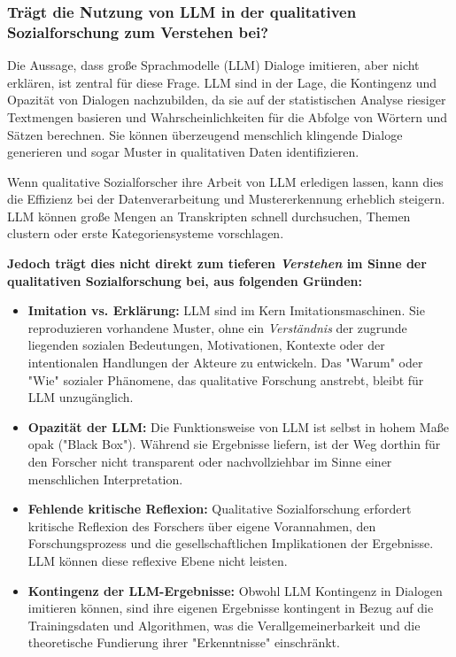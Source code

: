 \documentclass[
]{article}
\author{}
\date{}
\begin{document}
\subsubsection{\texorpdfstring{\textbf{Trägt die Nutzung von LLM in der
qualitativen Sozialforschung zum Verstehen
bei?}}{Trägt die Nutzung von LLM in der qualitativen Sozialforschung zum Verstehen bei?}}\label{truxe4gt-die-nutzung-von-llm-in-der-qualitativen-sozialforschung-zum-verstehen-bei}

Die Aussage, dass große Sprachmodelle (LLM) Dialoge imitieren, aber
nicht erklären, ist zentral für diese Frage. LLM sind in der Lage, die
Kontingenz und Opazität von Dialogen nachzubilden, da sie auf der
statistischen Analyse riesiger Textmengen basieren und
Wahrscheinlichkeiten für die Abfolge von Wörtern und Sätzen berechnen.
Sie können überzeugend menschlich klingende Dialoge generieren und sogar
Muster in qualitativen Daten identifizieren.

Wenn qualitative Sozialforscher ihre Arbeit von LLM erledigen lassen,
kann dies die Effizienz bei der Datenverarbeitung und Mustererkennung
erheblich steigern. LLM können große Mengen an Transkripten schnell
durchsuchen, Themen clustern oder erste Kategoriensysteme vorschlagen.

\textbf{Jedoch trägt dies nicht direkt zum tieferen \emph{Verstehen} im
Sinne der qualitativen Sozialforschung bei, aus folgenden Gründen:}

\begin{itemize}
\item
  \textbf{Imitation vs. Erklärung:} LLM sind im Kern
  Imitationsmaschinen. Sie reproduzieren vorhandene Muster, ohne ein
  \emph{Verständnis} der zugrunde liegenden sozialen Bedeutungen,
  Motivationen, Kontexte oder der intentionalen Handlungen der Akteure
  zu entwickeln. Das "Warum" oder "Wie" sozialer Phänomene, das
  qualitative Forschung anstrebt, bleibt für LLM unzugänglich.
\item
  \textbf{Opazität der LLM:} Die Funktionsweise von LLM ist selbst in
  hohem Maße opak ("Black Box"). Während sie Ergebnisse liefern, ist der
  Weg dorthin für den Forscher nicht transparent oder nachvollziehbar im
  Sinne einer menschlichen Interpretation.
\item
  \textbf{Fehlende kritische Reflexion:} Qualitative Sozialforschung
  erfordert kritische Reflexion des Forschers über eigene Vorannahmen,
  den Forschungsprozess und die gesellschaftlichen Implikationen der
  Ergebnisse. LLM können diese reflexive Ebene nicht leisten.
\item
  \textbf{Kontingenz der LLM-Ergebnisse:} Obwohl LLM Kontingenz in
  Dialogen imitieren können, sind ihre eigenen Ergebnisse kontingent in
  Bezug auf die Trainingsdaten und Algorithmen, was die
  Verallgemeinerbarkeit und die theoretische Fundierung ihrer
  "Erkenntnisse" einschränkt.
\end{itemize}
\end{document}
